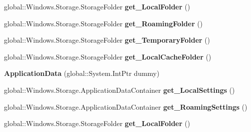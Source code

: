 \begin{DoxyCompactItemize}
\item 
\mbox{\label{class_windows_1_1_storage_1_1_application_data_a4be66d1c6f347f25204f30fba6f63485}} 
global\+::\+Windows.\+Storage.\+Storage\+Folder {\bfseries get\+\_\+\+Local\+Folder} ()
\item 
\mbox{\label{class_windows_1_1_storage_1_1_application_data_a195408f98de3b9e189bb12ea66880cb6}} 
global\+::\+Windows.\+Storage.\+Storage\+Folder {\bfseries get\+\_\+\+Roaming\+Folder} ()
\item 
\mbox{\label{class_windows_1_1_storage_1_1_application_data_a3f3b3cf88635a6774215a68677f6e5a7}} 
global\+::\+Windows.\+Storage.\+Storage\+Folder {\bfseries get\+\_\+\+Temporary\+Folder} ()
\item 
\mbox{\label{class_windows_1_1_storage_1_1_application_data_a1f35e4887e3eb7dd667bf1900f0371ce}} 
global\+::\+Windows.\+Storage.\+Storage\+Folder {\bfseries get\+\_\+\+Local\+Cache\+Folder} ()
\item 
\mbox{\label{class_windows_1_1_storage_1_1_application_data_a870285ae522d1069764e2fec1208bffb}} 
{\bfseries Application\+Data} (global\+::\+System.\+Int\+Ptr dummy)
\item 
\mbox{\label{class_windows_1_1_storage_1_1_application_data_aa776fab90569a200a9729b7a18d9f4aa}} 
global\+::\+Windows.\+Storage.\+Application\+Data\+Container {\bfseries get\+\_\+\+Local\+Settings} ()
\item 
\mbox{\label{class_windows_1_1_storage_1_1_application_data_a27e78d63f97516acd70935e1472a8c98}} 
global\+::\+Windows.\+Storage.\+Application\+Data\+Container {\bfseries get\+\_\+\+Roaming\+Settings} ()
\item 
\mbox{\label{class_windows_1_1_storage_1_1_application_data_a4be66d1c6f347f25204f30fba6f63485}} 
global\+::\+Windows.\+Storage.\+Storage\+Folder {\bfseries get\+\_\+\+Local\+Folder} ()

\end{DoxyCompactItemize}
